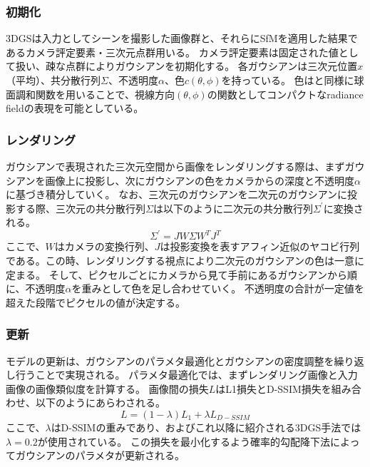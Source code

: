 \subsubsection*{初期化}
3DGSは入力としてシーンを撮影した画像群と、それらにSfMを適用した結果であるカメラ評定要素・三次元点群用いる。
カメラ評定要素は固定された値として扱い、疎な点群によりガウシアンを初期化する。
各ガウシアンは三次元位置$x$（平均）、共分散行列$\Sigma$、不透明度$\alpha$、色$c(\theta, \phi)$を持っている。
色は\cite{plenoxels}\cite{instant-ngp}と同様に球面調和関数を用いることで、視線方向$(\theta, \phi)$の関数としてコンパクトなradiance fieldの表現を可能としている。\par

\subsubsection*{レンダリング}
ガウシアンで表現された三次元空間から画像をレンダリングする際は、まずガウシアンを画像上に投影し、次にガウシアンの色をカメラからの深度と不透明度$\alpha$に基づき積分していく。
なお、三次元のガウシアンを二次元のガウシアンに投影する際、三次元の共分散行列$\Sigma$は以下のように二次元の共分散行列$\Sigma^{\prime}$に変換される。
\begin{equation}
  \Sigma^{\prime}=J W \Sigma W^T J^T
\end{equation}
ここで、$W$はカメラの変換行列、$J$は投影変換を表すアフィン近似のヤコビ行列である。この時、レンダリングする視点により二次元のガウシアンの色は一意に定まる。
そして、ピクセルごとにカメラから見て手前にあるガウシアンから順に、不透明度$\alpha$を重みとして色を足し合わせていく。
不透明度の合計が一定値を超えた段階でピクセルの値が決定する。\par

\subsubsection*{更新}
モデルの更新は、ガウシアンのパラメタ最適化とガウシアンの密度調整を繰り返し行うことで実現される。
パラメタ最適化では、まずレンダリング画像と入力画像の画像類似度を計算する。
画像間の損失$L$はL1損失とD-SSIM損失\cite{d-ssim}を組み合わせ、以下のようにあらわされる。
\begin{equation}
  L = (1 - \lambda)L_1 + {\lambda}L_{D-SSIM}
\end{equation}
ここで、$\lambda$はD-SSIMの重みであり、\cite{3dgs}およびこれ以降に紹介される3DGS手法では$\lambda = 0.2$が使用されている。
この損失を最小化するよう確率的勾配降下法によってガウシアンのパラメタが更新される。\par

